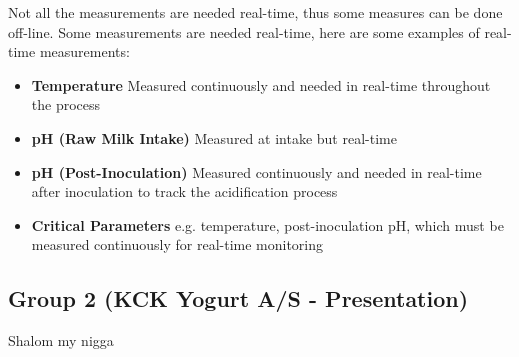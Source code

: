 Not all the measurements are needed real-time, thus some measures can be done off-line. Some measurements are needed real-time, here are some examples of real-time measurements:
\begin{highlight}
    \begin{itemize}
        \item \textbf{Temperature}
        \subitem Measured continuously and needed in real-time throughout the process
        \item \textbf{pH (Raw Milk Intake)}
        \subitem Measured at intake but real-time
        \item \textbf{pH (Post-Inoculation)}
        \subitem Measured continuously and needed in real-time after inoculation to track the acidification process
        \item \textbf{Critical Parameters}
        \subitem e.g. temperature, post-inoculation pH, which must be measured continuously for real-time monitoring
    \end{itemize}
\end{highlight}

\subsection{Group 2 (KCK Yogurt A/S - Presentation)}
Shalom my nigga 